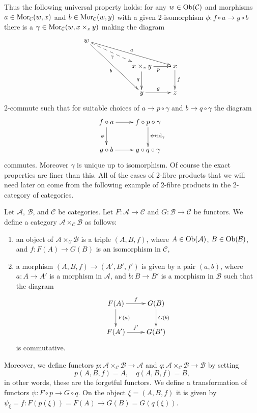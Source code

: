 \noindent
Thus the following universal property holds: for any
$w\in \mathop{\mathrm{Ob}}\nolimits(\mathcal{C})$ and morphisms
$a \in \mathop{\mathrm{Mor}}\nolimits_{\mathcal C}(w, x)$ and
$b \in \mathop{\mathrm{Mor}}\nolimits_\mathcal{C}(w, y)$ with a given 2-isomorphism
$\phi : f \circ a \to g\circ b$
there is a $\gamma \in \mathop{\mathrm{Mor}}\nolimits_{\mathcal C}(w, x \times_z y)$
making the diagram
$$
\xymatrix{
w\ar[rrrd]^a \ar@{-->}[rrd]_\gamma \ar[rrdd]_b & & \\
& & x \times_z y \ar[r]_p \ar[d]_q & x \ar[d]^{f} \\
& & y \ar[r]^{g} & z }
$$
2-commute such that for suitable choices of
$a \to p \circ \gamma$ and $b \to q \circ \gamma$
the diagram
$$
\xymatrix{
f \circ a \ar[r] \ar[d]_\phi &
f \circ p \circ \gamma
\ar[d]^{\psi \star \text{id}_\gamma}
\\
g\circ b
\ar[r]
&
g \circ q \circ \gamma
}
$$
commutes. Moreover $\gamma$ is unique up to isomorphism.
Of course the exact properties are finer than this. All of the
cases of 2-fibre products that we will need later on come from the following
example of 2-fibre products in the 2-category of categories.

\begin{example}
\label{example-2-fibre-product-categories}
Let $\mathcal{A}$, $\mathcal{B}$, and $\mathcal{C}$ be categories.
Let $F : \mathcal{A} \to \mathcal{C}$ and $G : \mathcal{B} \to \mathcal{C}$
be functors. We define a category
$\mathcal{A} \times_\mathcal{C} \mathcal{B}$ as follows:
\begin{enumerate}
\item an object of $\mathcal{A} \times_\mathcal{C} \mathcal{B}$ is a triple
$(A, B, f)$, where $A\in \mathop{\mathrm{Ob}}\nolimits(\mathcal{A})$, $B\in \mathop{\mathrm{Ob}}\nolimits(\mathcal{B})$,
and $f : F(A) \to G(B)$ is an isomorphism in $\mathcal{C}$,
\item a morphism $(A, B, f) \to (A', B', f')$ is given by a pair $(a, b)$, where
$a : A \to A'$ is a morphism in $\mathcal{A}$, and $b : B \to B'$ is a
morphism in $\mathcal{B}$ such that the diagram
$$
\xymatrix{
F(A) \ar[r]^f \ar[d]^{F(a)} & G(B) \ar[d]^{G(b)} \\
F(A') \ar[r]^{f'} & G(B')
}
$$
is commutative.
\end{enumerate}
Moreover, we define functors
$p : \mathcal{A} \times_\mathcal{C}\mathcal{B} \to \mathcal{A}$
and
$q : \mathcal{A} \times_\mathcal{C}\mathcal{B} \to \mathcal{B}$
by setting
$$
p(A, B, f) = A, \quad q(A, B, f) = B,
$$
in other words, these are the forgetful functors.
We define a transformation of functors $\psi : F \circ p \to G \circ q$.
On the object $\xi = (A, B, f)$ it is given by
$\psi_\xi = f : F(p(\xi)) = F(A) \to G(B) = G(q(\xi))$.
\end{example}

